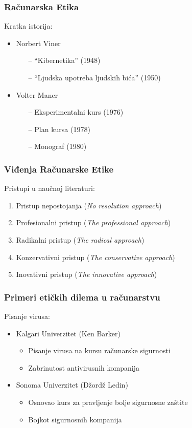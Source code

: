 \documentclass[pdf]{beamer}
\begin{document}
\begin{frame}
\frametitle{Računarska Etika}
	
	Kratka istorija:
	\begin{itemize}
	
	\item Norbert Viner
	\begin{itemize}
	\item[--] ``Kibernetika'' (1948) %
	\item[--] ``Ljudska upotreba ljudskih bića'' (1950)
	\end{itemize}
	
	\item Volter Maner
	\begin{itemize}
	\item[--] Eksperimentalni kurs (1976)
	\item[--] Plan kursa (1978)	
	\item[--] Monograf (1980) %
	\end{itemize}
	\end{itemize}
	\end{frame}

\begin{frame}
\frametitle{Viđenja Računarske Etike}

	Pristupi u naučnoj literaturi: %
	\begin{enumerate}
	\item Pristup nepostojanja (\textit{No resolution approach})
	\item Profesionalni pristup (\textit{The professional approach})
	\item Radikalni pristup (\textit{The radical approach})
	\item Konzervativni pristup (\textit{The conservative approach})
	\item Inovativni pristup (\textit{The innovative approach})
	\end{enumerate}
	\end{frame}


\begin{frame}
\frametitle{Primeri etičkih dilema u računarstvu}
		Pisanje virusa:
		\begin{itemize}
		\item Kalgari Univerzitet (Ken Barker)
			\begin{itemize}
			\item Pisanje virusa na kursu računarske sigurnosti
			\item Zabrinutost antivirusnih kompanija 
			\end{itemize}
		
		\item Sonoma Univerzitet (Džordž Ledin)
			\begin{itemize}
			\item Osnovao kurs za pravljenje bolje sigurnosne zaštite
			\item Bojkot sigurnosnih kompanija
			\end{itemize}
		\end{itemize}
\end{frame}
\end{document}
